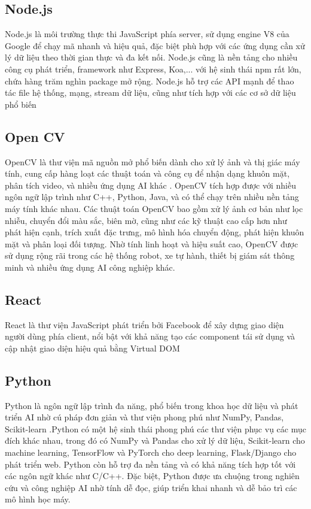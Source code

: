 \documentclass[../DoAn.tex]{subfiles}
\begin{document}
\subsection{Node.js}
Node.js là môi trường thực thi JavaScript phía server, sử dụng engine V8 của Google để chạy mã nhanh và hiệu quả, đặc biệt phù hợp với các ứng dụng cần xử lý dữ liệu theo thời gian thực và đa kết nối. Node.js cũng là nền tảng cho nhiều công cụ phát triển, framework như Express, Koa,... với hệ sinh thái npm rất lớn, chứa hàng trăm nghìn package mở rộng. Node.js hỗ trợ các API mạnh để thao tác file hệ thống, mạng, stream dữ liệu, cũng như tích hợp với các cơ sở dữ liệu phổ biến \cite{key}
\subsection{Open CV}
OpenCV là thư viện mã nguồn mở phổ biến dành cho xử lý ảnh và thị giác máy tính, cung cấp hàng loạt các thuật toán và công cụ để nhận dạng khuôn mặt, phân tích video, và nhiều ứng dụng AI khác \cite{opencvOpenCVOpenCV}. OpenCV tích hợp được với nhiều ngôn ngữ lập trình như C++, Python, Java, và có thể chạy trên nhiều nền tảng máy tính khác nhau. Các thuật toán OpenCV bao gồm xử lý ảnh cơ bản như lọc nhiễu, chuyển đổi màu sắc, biên mờ, cũng như các kỹ thuật cao cấp hơn như phát hiện cạnh, trích xuất đặc trưng, mô hình hóa chuyển động, phát hiện khuôn mặt và phân loại đối tượng. Nhờ tính linh hoạt và hiệu suất cao, OpenCV được sử dụng rộng rãi trong các hệ thống robot, xe tự hành, thiết bị giám sát thông minh và nhiều ứng dụng AI công nghiệp khác.
\subsection{React}
React là thư viện JavaScript phát triển bởi Facebook để xây dựng giao diện người dùng phía client, nổi bật với khả năng tạo các component tái sử dụng và cập nhật giao diện hiệu quả bằng Virtual DOM \cite{reactReact}
\subsection{Python}
Python là ngôn ngữ lập trình đa năng, phổ biến trong khoa học dữ liệu và phát triển AI nhờ cú pháp đơn giản và thư viện phong phú như NumPy, Pandas, Scikit-learn \cite{python}.Python có một hệ sinh thái phong phú các thư viện phục vụ các mục đích khác nhau, trong đó có NumPy và Pandas cho xử lý dữ liệu, Scikit-learn cho machine learning, TensorFlow và PyTorch cho deep learning, Flask/Django cho phát triển web. Python còn hỗ trợ đa nền tảng và có khả năng tích hợp tốt với các ngôn ngữ khác như C/C++. Đặc biệt, Python được ưa chuộng trong nghiên cứu và công nghiệp AI nhờ tính dễ đọc, giúp triển khai nhanh và dễ bảo trì các mô hình học máy.
\end{document}
